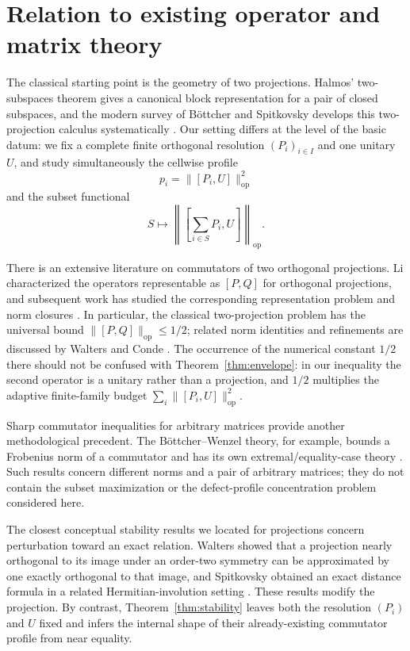 \documentclass[11pt]{article}
\newcommand{\op}{\mathrm{op}}
\begin{document}
\section{Relation to existing operator and matrix theory}
\label{sec:related}

The classical starting point is the geometry of two projections.  Halmos'
two-subspaces theorem gives a canonical block representation for a pair of
closed subspaces, and the modern survey of B{\"o}ttcher and Spitkovsky
develops this two-projection calculus systematically
\cite{Halmos1969TwoSubspaces,BottcherSpitkovsky2010}.  Our setting differs at
the level of the basic datum: we fix a complete finite orthogonal resolution
$(P_i)_{i\in I}$ and one unitary $U$, and study simultaneously the cellwise
profile
\[
  p_i=\|[P_i,U]\|_{\op}^2
\]
and the subset functional
\[
  S\longmapsto
  \left\|
    \left[\sum_{i\in S}P_i,U\right]
  \right\|_{\op}.
\]

There is an extensive literature on commutators of two orthogonal
projections.  Li characterized the operators representable as
$[P,Q]$ for orthogonal projections, and subsequent work has studied the
corresponding representation problem and norm closures
\cite{Li2004,ShiJi2019,MarcouxRadjaviZhang2024}.  In particular, the
classical two-projection problem has the universal bound
$\|[P,Q]\|_{\op}\le1/2$; related norm identities and refinements are discussed
by Walters and Conde \cite{Conde2022}.  The occurrence of the numerical
constant $1/2$ there should not be confused with
Theorem~\ref{thm:envelope}: in our inequality the second operator is a
unitary rather than a projection, and $1/2$ multiplies the adaptive
finite-family budget
$\sum_i\|[P_i,U]\|_{\op}^2$.

Sharp commutator inequalities for arbitrary matrices provide another
methodological precedent.  The B{\"o}ttcher--Wenzel theory, for example,
bounds a Frobenius norm of a commutator and has its own extremal/equality-case
theory \cite{BottcherWenzel2008}.  Such results concern different norms and a
pair of arbitrary matrices; they do not contain the subset maximization or
the defect-profile concentration problem considered here.

The closest conceptual stability results we located for projections concern
perturbation toward an exact relation.  Walters showed that a projection
nearly orthogonal to its image under an order-two symmetry can be approximated
by one exactly orthogonal to that image, and Spitkovsky obtained an exact
distance formula in a related Hermitian-involution setting
\cite{Walters2017,Spitkovsky2018Distance}.  These results modify the
projection.  By contrast, Theorem~\ref{thm:stability} leaves both the
resolution $(P_i)$ and $U$ fixed and infers the internal shape of their
already-existing commutator profile from near equality.
\end{document}
